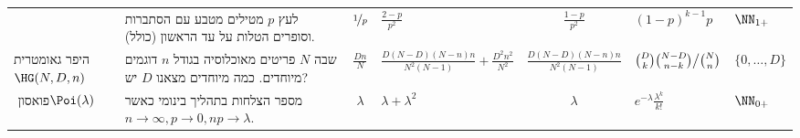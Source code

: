 \documentclass[8pt,twocolumn]{extarticle}
\begin{document}
{{\begin{minipage}{\columnwidth}
\begin{sideways}
\begin{tabular}{ R{1.7cm} | R{2.8cm} | c | C{2.1cm} | c | C{2.1cm} | C{1.7cm}}
                   & מטילים מטבע עם הסתברות ‎\(p\) לעץ וסופרים הטלות על עד הראשון (כולל).
          & ‎\(\nicefrac{1}{p}\)
                  & ‎\(\frac{2-p}{p^2}\)
                            & ‎\(\frac{1-p}{p^2}\)
                                     & ‎\((1-p)^{k-1}p\)
                                                  & ‎\(\NN_{1+}\) \\
          היפר גאומטרית \hspace*{\fill} \(\HG(N,D,n)\)
                   & דוגמים ‎\(n\) פריטים מאוכלוסיה בגודל ‎\(N\) שבה יש ‎\(D\) מיוחדים.
                     כמה מיוחדים מצאנו?
          & ‎\(\frac{Dn}{N}\)
                  & ‎\(\frac{D(N-D)(N-n)n}{N^2(N-1)} +\frac{D^2n^2}{N^2}\)
                            & ‎\(\frac{D(N-D)(N-n)n}{N^2(N-1)}\)
                                     & ‎\(\binom{D}{k}\binom{N-D}{n-k}\big{/}\binom{N}{n}\)
                                                  & ‎\(\{0, \dots ,D\}\) \\

          פואסון
          \hspace*{\fill}‏\(\Poi(\lambda)\)
                   & מספר הצלחות בתהליך בינומי כאשר ‎\(n\to \infty , p\to 0, n p\to \lambda \).
          & ‎\(\lambda \)
                  & ‎\(\lambda + \lambda^2\)
                            & ‎\(\lambda\)
                                     & ‎\(e^{-\lambda} \frac{\lambda^k}{k!}\)
                                                  & ‎\(\NN_{0+}\)
        \end{tabular}
\end{sideways}
\end{minipage}}}
\fi
\end{document}
